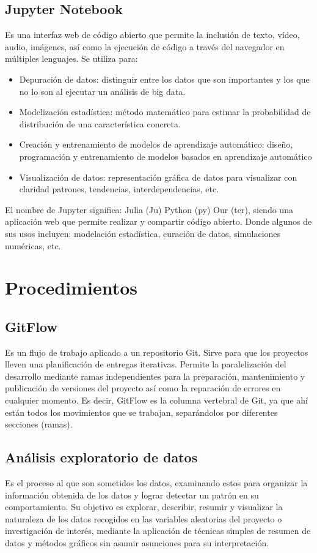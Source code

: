 \documentclass[12pt,letterpaper]{article}
\begin{document}
\subsection*{Jupyter Notebook}
Es una interfaz web de código abierto que permite la inclusión de texto, vídeo, audio, imágenes, así
como la ejecución de código a través del navegador en múltiples lenguajes. 
\citep{cabrera_diaz_jupyter}
Se utiliza para: 
\begin{itemize}
\item Depuración de datos: distinguir entre los datos que son importantes y los que no lo son al
ejecutar un análisis de big data.
\item Modelización estadística: método matemático para estimar la probabilidad de distribución de
una característica concreta.
\item Creación y entrenamiento de modelos de aprendizaje automático: diseño, programación y
entrenamiento de modelos basados en aprendizaje automático
\item Visualización de datos: representación gráfica de datos para visualizar con claridad patrones,
tendencias, interdependencias, etc.
\citep{digital_guide_ionos_jupyter}
\end{itemize}
El nombre de Jupyter significa: Julia (Ju) Python (py) Our (ter), siendo una aplicación web que
permite realizar y compartir código abierto. Donde algunos de sus usos incluyen: modelación
estadística, curación de datos, simulaciones numéricas, etc.

\section*{Procedimientos}
\subsection*{GitFlow}
Es un flujo de trabajo aplicado a un repositorio Git. Sirve para que los proyectos lleven una
planificación de entregas iterativas. Permite la paralelización del desarrollo mediante ramas
independientes para la preparación, mantenimiento y publicación de versiones del proyecto así como
la reparación de errores en cualquier momento.
\citep{claventy_2020}
Es decir, GitFlow es la columna vertebral de Git, ya que ahí están todos los movimientos que se
trabajan, separándolos por diferentes secciones (ramas).

\subsection*{Análisis exploratorio de datos}
Es el proceso al que son sometidos los datos, examinando estos para organizar la información
obtenida de los datos y lograr detectar un patrón en su comportamiento.
\citep{orella_analisis_exploratorio}
Su objetivo es explorar, describir, resumir y visualizar la naturaleza de los datos recogidos en las
variables aleatorias del proyecto o investigación de interés, mediante la aplicación de técnicas
simples de resumen de datos y métodos gráficos sin asumir asunciones para su interpretación.
\citep{heix_bios_analisis_exploratorio}
\end{document}
